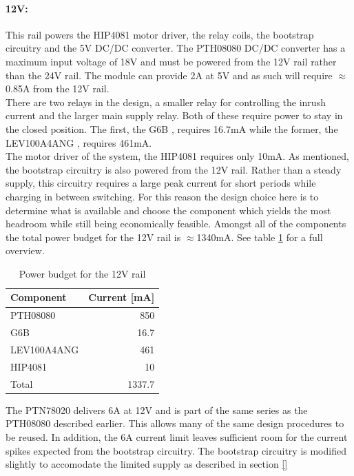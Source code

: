 \paragraph{12V:} %
\label{par:12v}
This rail powers the HIP4081 motor driver, the relay coils, the bootstrap circuitry and the 5V DC/DC converter.
The PTH08080 DC/DC converter has a maximum input voltage of 18V and must be powered from the 12V rail rather than the 24V rail.
The module can provide 2A at 5V and as such will require $\approx$0.85A from the 12V rail.\\
There are two relays in the design, a smaller relay for controlling the inrush current and the larger main supply relay.
Both of these require power to stay in the closed position.
The first, the G6B \cite{g6b}, requires 16.7mA while the former, the LEV100A4ANG \cite{lev100}, requires 461mA.\\
The motor driver of the system, the HIP4081 requires only 10mA.
As mentioned, the bootstrap circuitry is also powered from the 12V rail.
Rather than a steady supply, this circuitry requires a large peak current for short periods while charging in between switching.
For this reason the design choice here is to determine what is available and choose the component which yields the most headroom while still being economically feasible.
Amongst all of the components the total power budget for the 12V rail is $\approx$1340mA.
See table \ref{tab:12vpowerbudget} for a full overview.

\begin{table}
	\centering
	\begin{tabular}{l|r}
		 Component & Current [mA]\\
		 \hline
		 PTH08080 & 850\\
		 G6B & 16.7\\
		 LEV100A4ANG & 461\\
		 HIP4081 & 10\\
		 \hline
		 Total & 1337.7
	\end{tabular}
	\caption{Power budget for the 12V rail}
	\label{tab:12vpowerbudget}
\end{table}

The PTN78020 delivers 6A at 12V and is part of the same series as the PTH08080 described earlier.
This allows many of the same design procedures to be reused.
In addition, the 6A current limit leaves sufficient room for the current spikes expected from the bootstrap circuitry.
The bootstrap circuitry is modified slightly to accomodate the limited supply as described in section \ref{}

